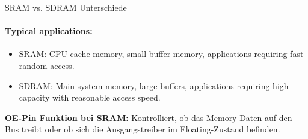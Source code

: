 \begin{concept}{SRAM vs. SDRAM Unterschiede}
\paragraph{Typical applications:}
   \begin{itemize}
     \item SRAM: CPU cache memory, small buffer memory, applications requiring fast random access.
     \item SDRAM: Main system memory, large buffers, applications requiring high capacity with reasonable access speed.
   \end{itemize}

    \textbf{OE-Pin Funktion bei SRAM:}
    Kontrolliert, ob das Memory Daten auf den Bus treibt oder ob sich die Ausgangstreiber im Floating-Zustand befinden.
\end{concept}


